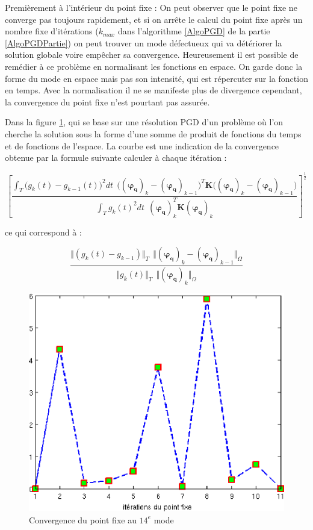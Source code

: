\documentclass[12pt,a4paper]{report}
\begin{document}
Premièrement à l'intérieur du point fixe : On peut observer que le point fixe ne converge pas toujours rapidement, et si on arrête le calcul du point fixe après un nombre fixe d'itérations ($k_{max}$ dans l'algorithme \ref{AlgoPGD} de la partie \ref{AlgoPGDPartie}) on peut trouver un mode défectueux qui va détériorer la solution globale voire empêcher sa convergence. Heureusement il est possible de remédier à ce problème en normalisant les fonctions en espace. On garde donc la forme du mode en espace mais pas son intensité, qui est répercuter sur la fonction en temps. Avec la normalisation il ne se manifeste plus de divergence cependant, la convergence du point fixe n'est pourtant pas assurée. 

Dans la figure \ref{ConvergenceDuPointFixe}, qui se base sur une résolution PGD d'un problème où l'on cherche la solution sous la forme d'une somme de produit de fonctions du temps et de fonctions de l'espace. La courbe est une indication de la convergence obtenue par la formule suivante calculer à chaque itération :

\begin{equation}
\left[
\frac{\displaystyle 
	\int_T \big(g_k(t) - g_{k-1}(t)\big)^2 dt  
		~~\big((\boldsymbol{\varphi_q})_k - (\boldsymbol{\varphi_q})_{k-1}\big)^T 
						\mathbf{K} 
		  \big((\boldsymbol{\varphi_q})_k - (\boldsymbol{\varphi_q})_{k-1}\big)
}
{\displaystyle 
\int_T g_k(t)^2 dt
	~~(\boldsymbol{\varphi_q})_k^T \mathbf{K} (\boldsymbol{\varphi_q})_k
} 
\right]^\frac{1}{2}
\end{equation}

ce qui correspond à :

\begin{equation}
\frac{\displaystyle 
	\big\Vert (g_k(t) - g_{k-1})\big\Vert_T 
		~~\big\Vert (\boldsymbol{\varphi_q})_k 
					- (\boldsymbol{\varphi_q})_{k-1} \big\Vert_\Omega
}
{\displaystyle 
	\big\Vert g_k(t) \big\Vert_T 
		~~\big\Vert (\boldsymbol{\varphi_q})_k \big\Vert_\Omega 
} 
\end{equation}


\begin{figure}[!ht]
\centering
\includegraphics[width=0.425\linewidth]{Images/ConvergenceDuPointFixeAvecNormMode14.eps}
\caption{Convergence du point fixe au $14^e$ mode \label{ConvergenceDuPointFixe}}
\end{figure}
\end{document}
